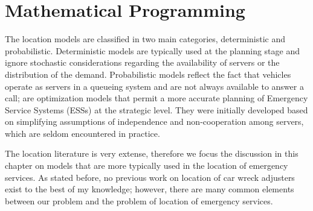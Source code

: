\section{Mathematical Programming}
The location models
are classified in two main categories,
deterministic and probabilistic.
Deterministic models
are typically used at the planning stage
and ignore stochastic considerations
regarding the availability of servers
or the distribution of the demand.
Probabilistic models
reflect the fact that
vehicles operate as servers in a queueing system
and are not always available
to answer a call;
are optimization models
that permit a more accurate planning
of Emergency Service Systems (ESSs)
at the strategic level.
They were initially developed
based on simplifying assumptions of independence
and non-cooperation among servers,
which are seldom encountered in practice.

The location literature is very extense,
therefore
we focus the discussion in this chapter
on models
that are more typically used
in the location of emergency services.
As stated before,
no previous work
on location of car wreck adjusters exist
to the best of my knowledge;
however,
there are many common elements
between our problem
and the problem of location of emergency services.



